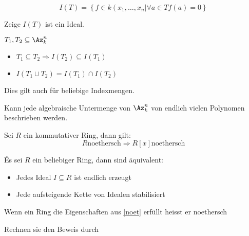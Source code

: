\begin{bem}
\begin{bsp}
\begin{prop}
\begin{itemize}
\begin{bsp}
\begin{defn}[Verschwindungsideal]
\[ I \left( T \right) = \left\lbrace f \in k \left( x_1, \dots , x_ n \vert \forall a \in T f \left(a \right) = 0 \right\rbrace \] 
\end{defn}
\begin{aufgabe}
Zeige \( I ( T) \) ist ein Ideal.
\end{aufgabe}
\begin{lem}
\( T_1 , T_2 \subseteq \Az^n_k \)
\begin{itemize}
\item \( T_1 \subseteq T_2 \Rightarrow I (T_2 ) \subseteq I(T_1) \)
\item \( I \left( T_1 \cup T_2 \right) = I \left( T_1 \right) \cap I \left( T_2 \right) \)
\end{itemize}
Dies gilt auch f\"ur beliebige Indexmengen.
\end{lem}
\begin{Frage}
Kann jede algebraische Untermenge von \( \Az^n_k \) von endlich vielen Polynomen beschrieben werden.
\end{Frage}
\begin{satz}
Sei  \( R \) ein kommutativer Ring, dann gilt:
\[ R \text{noethersch} \Rightarrow R\left[ x \right] \text{noethersch} \]
\end{satz}
\begin{lem}
És sei \( R \) ein beliebiger Ring, dann sind \"aquivalent:
\begin{itemize}
\label{noet}
\item Jedes Ideal \( I \subseteq R \) ist endlich erzeugt
\item Jede aufsteigende Kette von Idealen stabilisiert
\end{itemize}
\end{lem}
\begin{defn}[Noethersch]
Wenn ein Ring die Eigenschaften aus \ref{noet} erf\"ullt heisst er noethersch
\end{defn}
\begin{hausaufgabe}
Rechnen sie den Beweis durch
\end{hausaufgabe}


\end{bsp}
\end{itemize}
\end{prop}
\end{bsp}
\end{bem}

